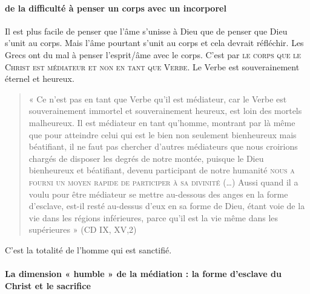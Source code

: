 \paragraph{de la difficulté à penser un corps avec un incorporel} Il est plus facile de penser que l'âme s'unisse à Dieu que de penser que Dieu s'unit au corps. Mais l'âme pourtant s'unit au corps et cela devrait réfléchir. Les Grecs ont du mal à penser l'esprit/âme avec le corps.  C'est par \textsc{le corps que le Christ est médiateur et non en tant que Verbe}. Le Verbe est souverainement éternel et heureux. 

\begin{quote}
    « Ce n’est pas en tant que Verbe qu’il est médiateur, car le Verbe est souverainement immortel et souverainement heureux, est loin des mortels malheureux. Il est médiateur en tant qu’homme, montrant par là même que pour atteindre celui qui est le bien non seulement bienheureux mais béatifiant, il ne faut pas chercher d’autres médiateurs que nous croirions chargés de disposer les degrés de notre montée, puisque le Dieu bienheureux et béatifiant, devenu participant de notre humanité \textsc{nous a fourni un moyen rapide de participer à sa divinité} (…) Aussi quand il a voulu pour être médiateur se mettre au-dessous des anges  en la forme d’esclave, est-il resté au-dessus d’eux en sa forme de Dieu, étant voie de la vie dans les régions inférieures, parce qu’il est la vie même dans les supérieures » (CD IX, XV,2) 
\end{quote}

C'est la totalité de l'homme qui est sanctifié.


 \paragraph{La dimension « humble » de la médiation : la forme d’esclave du Christ et le sacrifice } 




